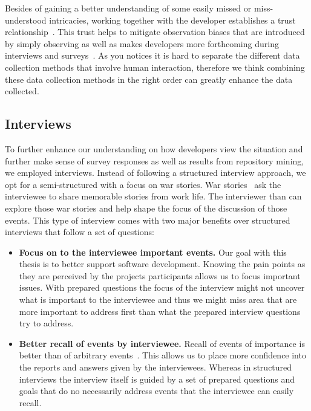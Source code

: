 Besides of gaining a better understanding of some easily missed or miss-understood intricacies, working together with the developer establishes a trust relationship~\cite{letherbridge:ese2005}.
This trust helps to mitigate observation biases that are introduced by simply observing as well as makes developers more forthcoming during interviews and surveys~\cite{letherbridge:ese2005}.
As you notices it is hard to separate the different data collection methods that involve human interaction, therefore we think combining these data collection methods in the right order can greatly enhance the data collected.


\subsection{Interviews}
To further enhance our understanding on how developers view the situation and further make sense of survey responses as well as results from repository mining, we employed interviews.
Instead of following a structured interview approach, we opt for a semi-structured with a focus on war stories.
War stories~\cite{lutters:ist:2007} ask the interviewee to share memorable stories from work life.
The interviewer than can explore those war stories and help shape the focus of the discussion of those events.
This type of interview comes with two major benefits over structured interviews that follow a set of questions:

\begin{itemize}
\item\textbf{Focus on to the interviewee important events.}
Our goal with this thesis is to better support software development.
Knowing the pain points as they are perceived by the projects participants allows us to focus important issues.
With prepared questions the focus of the interview might not uncover what is important to the interviewee and thus we might miss area that are more important to address first than what the prepared interview questions try to address.
\item\textbf{Better recall of events by interviewee.}
Recall of events of importance is better than of arbitrary events~\cite{lutters:ist:2007}.
This allows us to place more confidence into the reports and answers given by the interviewees.
Whereas in structured interviews the interview itself is guided by a set of prepared questions and goals that do no necessarily address events that the interviewee can easily recall.
\end{itemize}

